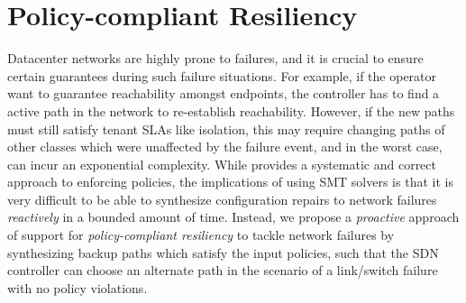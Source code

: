 \section{Policy-compliant Resiliency}
Datacenter networks are highly prone to failures, 
and it is crucial to ensure certain guarantees during such failure
situations. For example, if the operator want to guarantee
reachability amongst endpoints, the controller has to find a active
path in the network to re-establish reachability. However, if the new
paths must still satisfy tenant SLAs like isolation, this may require 
changing paths of other classes which were unaffected by the failure event,
and in the worst case, can incur an exponential complexity.
While \name provides a systematic and correct approach
to enforcing policies, the implications of using SMT solvers is that
it is very difficult to be able to synthesize configuration repairs to
network failures \emph{reactively} in a bounded amount of time. 
Instead, we propose a \emph{proactive} approach 
of support for \emph{policy-compliant resiliency} to tackle network failures
by synthesizing backup paths which satisfy the input policies, such that the SDN controller 
can choose an alternate path in the scenario of a link/switch failure with no
policy violations.

